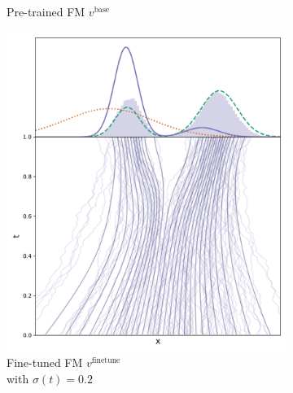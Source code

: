 \documentclass[]{fairmeta}
\begin{document}
\begin{figure}
\begin{subfigure}[t]{0.25\linewidth}
        \caption{Pre-trained FM $v^\mathrm{base}$}
    \end{subfigure}%
    \begin{subfigure}[t]{0.25\linewidth}
        \centering
        \includegraphics[width=\linewidth]{figs/finetune1d/finetuned_biased_model.png}
        \caption{Fine-tuned FM $v^\mathrm{finetune}$\\ with $\sigma(t) = 0.2$}
    \end{subfigure}%
    \begin{subfigure}[t]{0.25\linewidth}
        \centering

\end{subfigure}
\end{figure}
\end{document}
